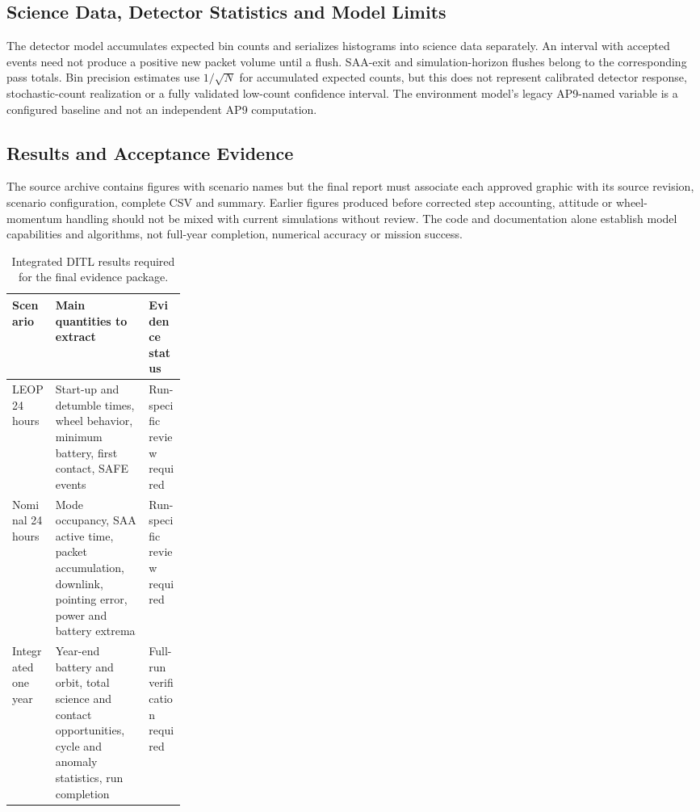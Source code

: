 \subsection{Science Data, Detector Statistics and Model Limits}\label{app:ditl-science}
The detector model accumulates expected bin counts and serializes histograms into science data separately. An interval with accepted events need not produce a positive new packet volume until a flush. SAA-exit and simulation-horizon flushes belong to the corresponding pass totals. Bin precision estimates use $1/\sqrt{N}$ for accumulated expected counts, but this does not represent calibrated detector response, stochastic-count realization or a fully validated low-count confidence interval. The environment model's legacy AP9-named variable is a configured baseline and not an independent AP9 computation.
\subsection{Results and Acceptance Evidence}\label{app:ditl-evidence}
The source archive contains figures with scenario names but the final report must associate each approved graphic with its source revision, scenario configuration, complete CSV and summary. Earlier figures produced before corrected step accounting, attitude or wheel-momentum handling should not be mixed with current simulations without review. The code and documentation alone establish model capabilities and algorithms, not full-year completion, numerical accuracy or mission success.
\begin{table}[htbp]\centering\caption{Integrated DITL results required for the final evidence package.}\label{tab:ditl-closure}\begin{tabularx}{\linewidth}{p{0.25\linewidth}XX}\toprule Scenario & Main quantities to extract & Evidence status\\\midrule
LEOP 24 hours & Start-up and detumble times, wheel behavior, minimum battery, first contact, SAFE events & Run-specific review required\\
Nominal 24 hours & Mode occupancy, SAA active time, packet accumulation, downlink, pointing error, power and battery extrema & Run-specific review required\\
Integrated one year & Year-end battery and orbit, total science and contact opportunities, cycle and anomaly statistics, run completion & Full-run verification required\\\bottomrule\end{tabularx}\end{table}
